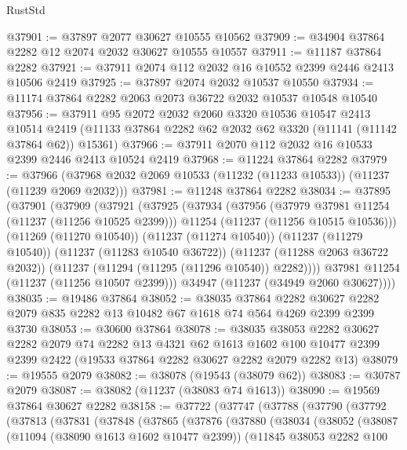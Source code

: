 \begin{lexlean}{RustStd}
\begin{coremodule}
@37901 := @37897 @2077 @30627 @10555 @10562
@37909 := @34904 @37864 @2282 @12 @2074 @2032 @30627 @10555 @10557
@37911 := @11187 @37864 @2282
@37921 := @37911 @2074 @112 @2032 @16 @10552 @2399 @2446 @2413 @10506 @2419
@37925 := @37897 @2074 @2032 @10537 @10550
@37934 := @11174 @37864 @2282 @2063 @2073 @36722 @2032 @10537 @10548 @10540
@37956 := @37911
    @95
    @2072
    @2032
    @2060
    @3320
    @10536
    @10547
    @2413
    @10514
    @2419
    (@11133 @37864 @2282 @62 @2032 @62 @3320 (@11141 (@11142 @37864 @62)) @15361)
@37966 := @37911 @2070 @112 @2032 @16 @10533 @2399 @2446 @2413 @10524 @2419
@37968 := @11224 @37864 @2282
@37979 := @37966 (@37968 @2032 @2069 @10533 (@11232 (@11233 @10533)) (@11237 (@11239 @2069 @2032)))
@37981 := @11248 @37864 @2282
@38034 := @37895
    (@37901
      (@37909
        (@37921
          (@37925
            (@37934
              (@37956
                (@37979 @37981 @11254 (@11237 (@11256 @10525 @2399)))
                @11254
                (@11237 (@11256 @10515 @10536)))
              (@11269 (@11270 @10540))
              (@11237 (@11274 @10540))
              (@11237 (@11279 @10540))
              (@11237 (@11283 @10540 @36722))
              (@11237 (@11288 @2063 @36722 @2032))
              (@11237 (@11294 (@11295 (@11296 @10540)) @2282))))
          @37981
          @11254
          (@11237 (@11256 @10507 @2399)))
        @34947
        (@11237 (@34949 @2060 @30627))))
@38035 := @19486 @37864
@38052 := @38035
    @37864
    @2282
    @30627
    @2282
    @2079
    @835
    @2282
    @13
    @10482
    @67
    @1618
    @74
    @564
    @4269
    @2399
    @2399
    @3730
@38053 := @30600 @37864
@38078 := @38035
    @38053
    @2282
    @30627
    @2282
    @2079
    @74
    @2282
    @13
    @4321
    @62
    @1613
    @1602
    @100
    @10477
    @2399
    @2399
    @2422
    (@19533 @37864 @2282 @30627 @2282 @2079 @2282 @13)
@38079 := @19555 @2079
@38082 := @38078 (@19543 (@38079 @62))
@38083 := @30787 @2079
@38087 := @38082 (@11237 (@38083 @74 @1613))
@38090 := @19569 @37864 @30627 @2282
@38158 := @37722
    (@37747
      (@37788
        (@37790
          (@37792
            (@37813
              (@37831
                (@37848
                  (@37865
                    (@37876
                      (@37880
                        (@38034
                          (@38052
                            (@38087
                              (@11094 (@38090 @1613 @1602 @10477 @2399))
                              (@11845
                                @38053
                                @2282
                                @100

\end{coremodule}
\end{lexlean}
